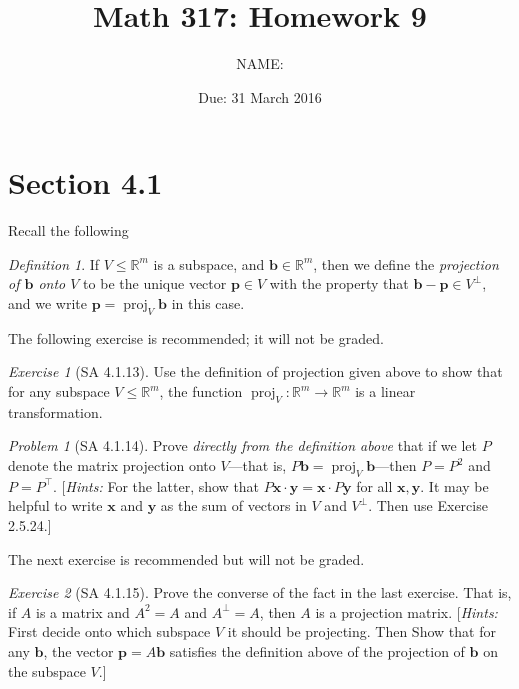 \documentclass[11pt]{paper}
\author         {NAME:                     }
\title{Math 317: Homework 9}
\date{Due: 31 March 2016}
\theoremstyle{remark}
\newtheorem{problem}{Problem}
\newtheorem*{definition}{Definition}
\newtheorem*{exercise}{Exercise}
\newtheorem*{solution}{{\bf Solution}}
\newcommand\R{\fld{R}}
\newcommand\proj{\ensuremath{\operatorname{proj}}}
\renewcommand{\vec}[1]{\mathbf{#1}}
\newcommand{\<}{\ensuremath{\langle}}
\renewcommand{\>}{\ensuremath{\rangle}}
\newcommand\fld[1]{\ensuremath{\mathbb{#1}}}
\newcommand\vb{\vec{b}}
\newcommand\vp{\vec{p}}
\newcommand\vx{\vec{x}}
\newcommand\vy{\vec{y}}
\begin{document}
\maketitle

\section*{Section 4.1}
\noindent Recall the following
\begin{definition}
If $V \leq \R^m$ is a subspace, and $\vb \in \R^m$, then we define the 
\emph{projection of $\vb$ onto $V$} to be the unique vector $\vp \in V$ 
with the property that $\vb - \vp \in V^\bot$, and we write $\vp = \proj_V\vb$
in this case.
\end{definition}

\medskip
\noindent The following exercise is recommended; it will not be graded.

\begin{exercise}[SA 4.1.13]
Use the definition of projection given above to show that for any subspace 
$V \leq \R^m$, the function $\proj_V : \R^m \to \R^m$ is a linear
transformation.  %
\end{exercise}

\newpage
\begin{problem}[SA 4.1.14]
Prove \emph{directly from the definition above} that if 
we let $P$ denote the matrix projection onto $V$---that is, 
$P\vb = \proj_V\vb$---then $P = P^2$ and
$P = P^\top$. [{\it Hints:} For the latter, show that 
$P\vx\cdot \vy = \vx \cdot P\vy$ 
for all $\vx, \vy$. It may be helpful
to write $\vx$ and $\vy$ as the sum of vectors in 
$V$ and $V^\bot$. Then use Exercise 2.5.24.]
\end{problem}


\newpage

\noindent The next exercise is recommended but will not be graded.
\medskip

\begin{exercise}[SA 4.1.15]
Prove the converse of the fact in the last exercise. That is,
if $A$ is a matrix and $A^2 = A$ and $A^\bot = A$, then $A$ is a projection 
matrix. [{\it Hints:} 
First decide onto which subspace $V$ it should be projecting. 
Then Show that for any $\vb$, the vector 
$\vp = A\vb$ satisfies the definition above of the projection of $\vb$ on the 
subspace $V$.]
\end{exercise}
\end{document}

